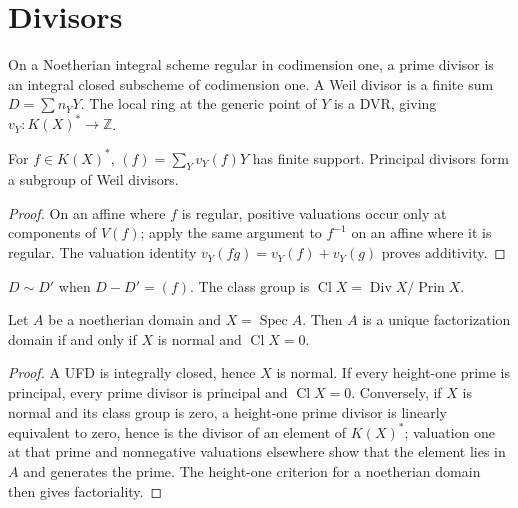 \section{Divisors}

\begin{definition}
\label{def:II-6-weil}
On a Noetherian integral scheme regular in codimension one, a prime divisor is an integral closed
subscheme of codimension one. A Weil divisor is a finite sum $D=\sum n_Y Y$. The local ring at the
generic point of $Y$ is a DVR, giving $v_Y:K(X)^*\to\mathbb Z$.
\end{definition}

\begin{proposition}
\label{prop:II-6-1}
For $f\in K(X)^*$, $(f)=\sum_Yv_Y(f)Y$ has finite support. Principal divisors form a subgroup of Weil
divisors.
\end{proposition}
\begin{proof}
On an affine where $f$ is regular, positive valuations occur only at components of $V(f)$; apply the same
argument to $f^{-1}$ on an affine where it is regular. The valuation identity
$v_Y(fg)=v_Y(f)+v_Y(g)$ proves additivity.
\end{proof}

\begin{definition}
\label{def:II-6-class}
$D\sim D'$ when $D-D'=(f)$. The class group is $\operatorname{Cl}X=\operatorname{Div}X/\operatorname{Prin}X$.
\end{definition}

\begin{theorem}
\label{thm:II-6-2}
Let $A$ be a noetherian domain and $X=\operatorname{Spec}A$.  Then $A$ is a
unique factorization domain if and only if $X$ is normal and $\operatorname{Cl}X=0$.
\end{theorem}
\begin{proof}
A UFD is integrally closed, hence $X$ is normal.  If every height-one prime is principal, every
prime divisor is principal and $\operatorname{Cl}X=0$.  Conversely, if $X$ is normal and its class
group is zero, a height-one prime divisor is linearly equivalent to zero, hence is the divisor of
an element of $K(X)^*$; valuation one at that prime and nonnegative valuations elsewhere show that
the element lies in $A$ and generates the prime.  The height-one criterion for a noetherian domain
then gives factoriality.
\end{proof}

